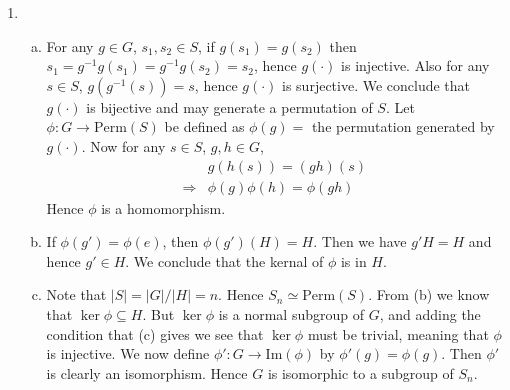 \documentclass[A4paper,12pt]{article}
\theoremstyle{definition}
\numberwithin{equation}{section}
\begin{document}
\begin{enumerate}[1)]
\begin{enumerate}[(a)]
        \end{enumerate}
    \item
        \begin{enumerate}[(a)]
            \item
                For any $g \in G$, $s_1, s_2 \in S$, if $g(s_1) = g(s_2)$ then $s_1 = g^{-1}g(s_1) = g^{-1}g(s_2) = s_2$, hence $g(\cdot)$ is injective.
                Also for any $s \in S$, $g(g^{-1}(s)) = s$, hence $g(\cdot)$ is surjective. We conclude that $g(\cdot)$ is bijective and may generate a permutation of $S$.
                Let $\phi: G \rightarrow \mathrm{Perm}(S)$ be defined as $\phi(g) = $ the permutation generated by $g(\cdot)$.
                Now for any $s \in S$, $g, h \in G$, \begin{align*}
                    &g(h(s)) = (gh)(s) \\
                    \Rightarrow &\phi(g)\phi(h) = \phi(gh)
                \end{align*}
                Hence $\phi$ is a homomorphism.
            \item
                If $\phi(g') = \phi(e)$, then $\phi(g')(H) = H$. Then we have $g'H = H$ and hence $g' \in H$. We conclude that the kernal of $\phi$ is in $H$.
            \item
                Note that $|S| = |G| / |H| = n$. Hence $S_n \simeq \mathrm{Perm}(S)$.
                From (b) we know that $\ker \phi \subseteq H$. But $\ker \phi$ is a normal subgroup of $G$, and adding the condition that (c) gives we see that $\ker \phi$ must be trivial, meaning that $\phi$ is injective. We now define $\phi': G \rightarrow \mathrm{Im}(\phi)$ by $\phi'(g) = \phi(g)$. 
                Then $\phi'$ is clearly an isomorphism. Hence $G$ is isomorphic to a subgroup of $S_n$.
        \end{enumerate}


\end{enumerate}
\end{document}
